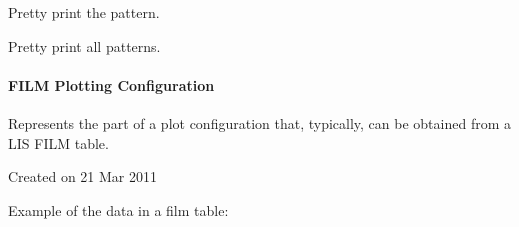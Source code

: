\documentclass[letterpaper,10pt,english]{sphinxmanual}
\begin{document}

\begin{fulllineitems}
\label{\detokenize{ref/util/plot/AREACfg:TotalDepth.util.plot.AREACfg.pprintPattern}}
Pretty print the pattern.

\end{fulllineitems}


\begin{fulllineitems}
\label{\detokenize{ref/util/plot/AREACfg:TotalDepth.util.plot.AREACfg.pprintAll}}
Pretty print all patterns.

\end{fulllineitems}



\paragraph{FILM Plotting Configuration}
\label{\detokenize{ref/util/plot/FILMCfg:module-TotalDepth.util.plot.FILMCfg}}\label{\detokenize{ref/util/plot/FILMCfg::doc}}\label{\detokenize{ref/util/plot/FILMCfg:film-plotting-configuration}}
Represents the part of a plot configuration that, typically, can be obtained
from a LIS FILM table.

Created on 21 Mar 2011

Example of the data in a film table:

\begin{sphinxVerbatim}[commandchars=\\\{\}]
     

        

             
             
\end{sphinxVerbatim}
\end{document}
